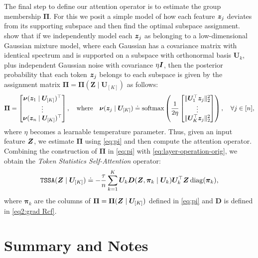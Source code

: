 \documentclass[../../book-main.tex]{subfiles}
\begin{document}
The final step to define our attention operator is to estimate the group membership $\bm\Pi$. For this we posit a simple model of how each feature \(\bm{z}_{j}\) deviates from its supporting subspace and then find the optimal subspace assignment. \cite{yu2023white} show that if we independently model each \(\bm{z}_{j}\) as belonging to a low-dimensional Gaussian mixture model, where each Gaussian has a covariance matrix with identical spectrum and is supported on a subspace with orthonormal basis \(\bm U_{k}\), plus independent Gaussian noise with covariance \(\eta \bm{I}\), then the posterior probability that each token \(\bm{z}_{j}\) belongs to each subspace is given by the assignment matrix \(\bm \Pi = \bm \Pi(\bm Z \mid \bm U_{[K]})\) as follows:
\begin{align}\label{eq:pi}
    \bm \Pi = \begin{bmatrix} \boldsymbol{\nu}(\bm{z}_1 \mid \bm U_{[K]})^\top \\ \vdots \\ \boldsymbol{\nu}(\bm{z}_n \mid \bm U_{[K]})^\top \end{bmatrix}, \quad
\text{where} \quad 
\boldsymbol{\nu}(\bm{z}_j \mid \bm U_{[K]}) \doteq \operatorname{softmax}\left( \frac{1}{2\eta} \begin{bmatrix} \|  \bm U_{1}^{\top} \bm{z}_j \|_2^2 \\ \vdots \\ \| \bm U_{K}^{\top} \bm{z}_j \|_2^2 \end{bmatrix} \right), \quad \forall j \in [n],
\end{align}
where $\eta$ becomes a learnable temperature parameter. Thus, given an input feature \(\bm{Z}\), we estimate \(\bm\Pi\) using \eqref{eq:pi} and then compute the attention operator.  Combining the construction of $\bm\Pi$ in \eqref{eq:pi} with 
\eqref{eq:layer-operation-orig}, we obtain the {\em Token Statistics Self-Attention} operator: 
\begin{equation}
    \label{eq:tssa}
   \texttt{TSSA}(\bm{Z} \mid \bm U_{[K]}) \doteq -\frac{\tau}{n}\sum_{k = 1}^{K}\bm U_{k}\bm D(\bm{Z}, \bm\pi_{k} \mid \bm U_{k})\bm U_{k}^{\top}\bm{Z}\operatorname{diag}(\bm \pi_{k}),
\end{equation}
where \(\bm\pi_{k}\) are the columns of \(\bm\Pi = \bm\Pi(\bm{Z} \mid \bm U_{[K]})\) defined in \eqref{eq:pi} and \(\bm D\) is defined in \eqref{eq2:grad Rcf}. 




\section{Summary and Notes}
\end{document}
